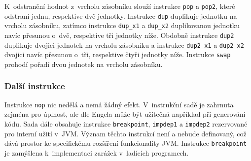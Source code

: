 K~odstranění hodnot z~vrcholu zásobníku slouží instrukce \texttt{pop} a \texttt{pop2}, které odstraní jednu, respektive dvě jednotky. Instrukce \texttt{dup} duplikuje jednotku na vrcholu zásobníku, zatímco instrukce \texttt{dup\_x1} a \texttt{dup\_x2} duplikovanou jednotku navíc přesunou o~dvě, respektive tři jednotky níže. Obdobně instrukce \texttt{dup2} duplikuje dvojici jednotek na vrcholu zásobníku a instrukce \texttt{dup2\_x1} a \texttt{dup2\_x2} dvojici navíc přesunou o~tři, respektive čtyři jednotky níže. Instrukce 
\texttt{swap} prohodí pořadí dvou jednotek na vrcholu zásobníku.

\subsubsection{Další instrukce}

Instrukce \texttt{nop} nic nedělá a nemá žádný efekt. V~instrukční sadě je zahrnuta zejména pro úplnost, ale dle Engela \cite{Engel:JVM} může být užitečná například při generování kódu.
Sada dále obsahuje instrukce \texttt{breakpoint}, \texttt{impdep1} a \texttt{impdep2} rezervované pro interní užití v~JVM. Význam těchto instrukcí není a nebude definovaný, což dává prostor ke specifickému rozšíření funkcionality JVM. Instrukce \texttt{breakpoint} je zamýšlena k~implementaci zarážek v~ladících programech. 


